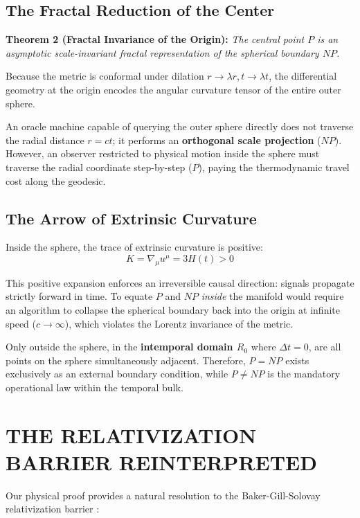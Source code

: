 \documentclass[10pt,twocolumn]{article}
\begin{document}
\subsection{The Fractal Reduction of the Center}

\textbf{Theorem 2 (Fractal Invariance of the Origin):}  
\textit{The central point $P$ is an asymptotic scale-invariant fractal representation of the spherical boundary $NP$.}

Because the metric is conformal under dilation $r \to \lambda r, t \to \lambda t$, the differential geometry at the origin encodes the angular curvature tensor of the entire outer sphere. 

An oracle machine capable of querying the outer sphere directly does not traverse the radial distance $r = ct$; it performs an \textbf{orthogonal scale projection} ($NP$). However, an observer restricted to physical motion inside the sphere must traverse the radial coordinate step-by-step ($P$), paying the thermodynamic travel cost along the geodesic.


\subsection{The Arrow of Extrinsic Curvature}

Inside the sphere, the trace of extrinsic curvature is positive:
\begin{equation}
  K = \nabla_\mu u^\mu = 3H(t) > 0
\end{equation}

This positive expansion enforces an irreversible causal direction: signals propagate strictly forward in time. To equate $P$ and $NP$ \textit{inside} the manifold would require an algorithm to collapse the spherical boundary back into the origin at infinite speed ($c \to \infty$), which violates the Lorentz invariance of the metric.

Only outside the sphere, in the \textbf{intemporal domain $R_0$} where $\Delta t = 0$, are all points on the sphere simultaneously adjacent. Therefore, $P = NP$ exists exclusively as an external boundary condition, while $P \neq NP$ is the mandatory operational law within the temporal bulk.



\section{THE RELATIVIZATION BARRIER REINTERPRETED}

Our physical proof provides a natural resolution to the Baker-Gill-Solovay relativization barrier \cite{BGS1975}:
\end{document}
